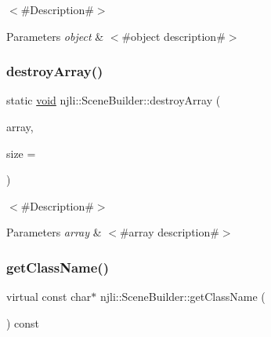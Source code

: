 $<$\#\+Description\#$>$


\begin{DoxyParams}{Parameters}
{\em object} & $<$\#object description\#$>$ \\
\hline
\end{DoxyParams}
\mbox{\label{classnjli_1_1_scene_builder_a2fdae0dad7bc105720ec40e4500455f7}} 
\subsubsection{\texorpdfstring{destroy\+Array()}{destroyArray()}}
{\footnotesize\ttfamily static \mbox{\hyperlink{_thread_8h_af1e856da2e658414cb2456cb6f7ebc66}{void}} njli\+::\+Scene\+Builder\+::destroy\+Array (\begin{DoxyParamCaption}\item[{\mbox{\hyperlink{classnjli_1_1_scene_builder}{Scene\+Builder}} $\ast$$\ast$}]{array,  }\item[{const \mbox{\hyperlink{_util_8h_a10e94b422ef0c20dcdec20d31a1f5049}{u32}}}]{size = {} }\end{DoxyParamCaption})\hspace{0.3cm}{\ttfamily [static]}}

$<$\#\+Description\#$>$


\begin{DoxyParams}{Parameters}
{\em array} & $<$\#array description\#$>$ \\
\hline
\end{DoxyParams}
\mbox{\label{classnjli_1_1_scene_builder_af0655e6ef38a89ff1c8d663d5163fc91}} 
\subsubsection{\texorpdfstring{get\+Class\+Name()}{getClassName()}}
{\footnotesize\ttfamily virtual const char$\ast$ njli\+::\+Scene\+Builder\+::get\+Class\+Name (\begin{DoxyParamCaption}{ }\end{DoxyParamCaption}) const\hspace{0.3cm}{\ttfamily [virtual]}}

